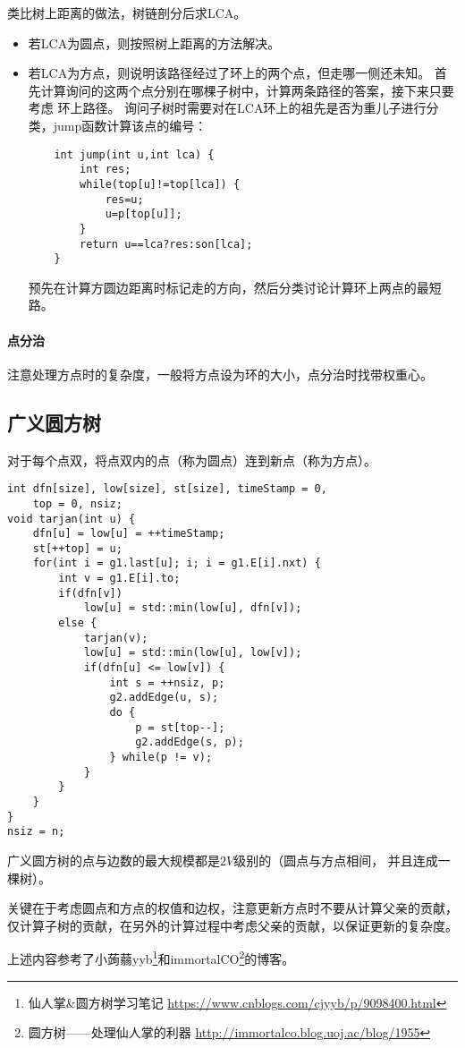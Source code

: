 类比树上距离的做法，树链剖分后求LCA。
\begin{itemize}
    \item 若LCA为圆点，则按照树上距离的方法解决。
    \item 若LCA为方点，则说明该路径经过了环上的两个点，但走哪一侧还未知。
    首先计算询问的这两个点分别在哪棵子树中，计算两条路径的答案，接下来只要考虑
    环上路径。
    询问子树时需要对在LCA环上的祖先是否为重儿子进行分类，jump函数计算该点的编号：
    \begin{lstlisting}
    int jump(int u,int lca) {
        int res;
        while(top[u]!=top[lca]) {
            res=u;
            u=p[top[u]];
        }
        return u==lca?res:son[lca];
    }
    \end{lstlisting}
    预先在计算方圆边距离时标记走的方向，然后分类讨论计算环上两点的最短路。
\end{itemize}
\paragraph{点分治}
注意处理方点时的复杂度，一般将方点设为环的大小，点分治时找带权重心。
\subsection{广义圆方树}
对于每个点双，将点双内的点（称为圆点）连到新点（称为方点）。
\begin{lstlisting}
int dfn[size], low[size], st[size], timeStamp = 0,
    top = 0, nsiz;
void tarjan(int u) {
    dfn[u] = low[u] = ++timeStamp;
    st[++top] = u;
    for(int i = g1.last[u]; i; i = g1.E[i].nxt) {
        int v = g1.E[i].to;
        if(dfn[v])
            low[u] = std::min(low[u], dfn[v]);
        else {
            tarjan(v);
            low[u] = std::min(low[u], low[v]);
            if(dfn[u] <= low[v]) {
                int s = ++nsiz, p;
                g2.addEdge(u, s);
                do {
                    p = st[top--];
                    g2.addEdge(s, p);
                } while(p != v);
            }
        }
    }
}
nsiz = n;
\end{lstlisting}
广义圆方树的点与边数的最大规模都是$2V$级别的（圆点与方点相间，
并且连成一棵树）。

关键在于考虑圆点和方点的权值和边权，注意更新方点时不要从计算父亲的贡献，
仅计算子树的贡献，在另外的计算过程中考虑父亲的贡献，以保证更新的复杂度。

上述内容参考了小蒟蒻yyb\footnote{仙人掌\&圆方树学习笔记
    \url{https://www.cnblogs.com/cjyyb/p/9098400.html}
}和immortalCO\footnote{圆方树——处理仙人掌的利器
    \url{http://immortalco.blog.uoj.ac/blog/1955}
}的博客。
